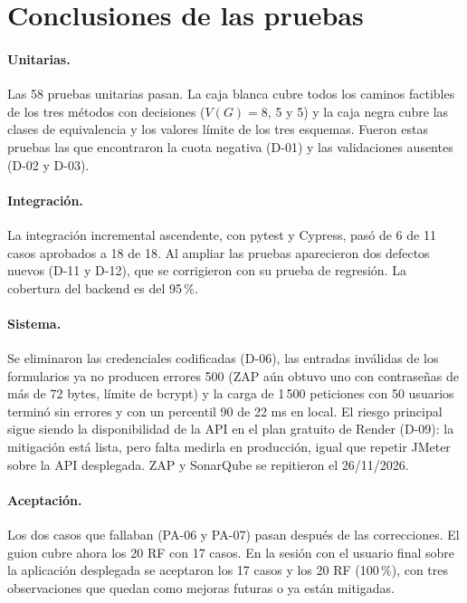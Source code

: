 \section{Conclusiones de las pruebas}

\paragraph{Unitarias.} Las 58 pruebas unitarias pasan. La caja blanca cubre todos los caminos factibles de los tres métodos con decisiones ($V(G) = 8$, 5 y 5) y la caja negra cubre las clases de equivalencia y los valores límite de los tres esquemas. Fueron estas pruebas las que encontraron la cuota negativa (D-01) y las validaciones ausentes (D-02 y D-03).

\paragraph{Integración.} La integración incremental ascendente, con pytest y Cypress, pasó de 6 de 11 casos aprobados a 18 de 18. Al ampliar las pruebas aparecieron dos defectos nuevos (D-11 y D-12), que se corrigieron con su prueba de regresión. La cobertura del backend es del 95\,\%.

\paragraph{Sistema.} Se eliminaron las credenciales codificadas (D-06), las entradas inválidas de los formularios ya no producen errores 500 (ZAP aún obtuvo uno con contraseñas de más de 72 bytes, límite de bcrypt) y la carga de 1\,500 peticiones con 50 usuarios terminó sin errores y con un percentil 90 de 22 ms en local. El riesgo principal sigue siendo la disponibilidad de la API en el plan gratuito de Render (D-09): la mitigación está lista, pero falta medirla en producción, igual que repetir JMeter sobre la API desplegada. ZAP y SonarQube se repitieron el 26/11/2026.

\paragraph{Aceptación.} Los dos casos que fallaban (PA-06 y PA-07) pasan después de las correcciones. El guion cubre ahora los 20 RF con 17 casos. En la sesión con el usuario final sobre la aplicación desplegada se aceptaron los 17 casos y los 20 RF (100\,\%), con tres observaciones que quedan como mejoras futuras o ya están mitigadas.
